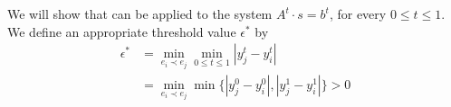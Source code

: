 We will show that  can be applied to the
system $A^t\cdot s=b^t$, for every $0\le t\le 1$. We define
an appropriate threshold value $  \epsilon^*$ by
\begin{align*}
  \epsilon^*&
              =
              \min_{e_i\prec e_j}  
              \min_{0\le t\le 1}
              |y_j^t-y_i^t| %
 \\            &
              =%
              \min_{e_i\prec e_j}  
              \min\{|y_j^0-y_i^0|,|y_j^1-y_i^1|\}%
              > 0
\end{align*}









